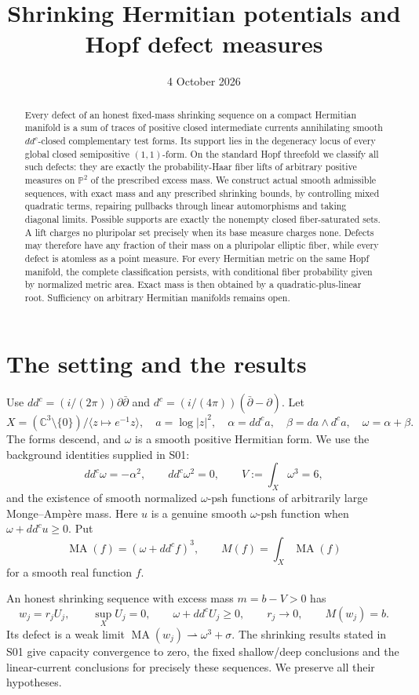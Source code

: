 \documentclass[11pt]{article}
\title{Shrinking Hermitian potentials and Hopf defect measures}
\author{}
\date{4 October 2026}
\newcommand{\ddc}{dd^c}
\newcommand{\MA}{\operatorname{MA}}
\begin{document}
\maketitle
\begin{abstract}
Every defect of an honest fixed-mass shrinking sequence on a compact
Hermitian manifold is a sum of traces of positive closed intermediate
currents annihilating smooth $dd^c$-closed complementary test forms.
Its support lies in the
degeneracy locus of every global closed semipositive $(1,1)$-form.
On the standard Hopf threefold we classify all such defects: they are
exactly the probability-Haar fiber lifts of arbitrary positive measures
on $\mathbb P^2$ of the prescribed excess mass. We construct actual
smooth admissible sequences, with exact mass and any prescribed
shrinking bounds, by controlling mixed quadratic terms, repairing
pullbacks through linear automorphisms and taking diagonal limits.
Possible supports are exactly the nonempty closed fiber-saturated sets.
A lift charges no pluripolar set precisely when its base measure
charges none. Defects may therefore have any fraction of their mass
on a pluripolar elliptic fiber, while every defect is atomless as a
point measure. For every Hermitian metric on the same Hopf manifold,
the complete classification persists, with conditional fiber probability given
by normalized metric area. Exact mass is then obtained by a
quadratic-plus-linear root. Sufficiency on arbitrary Hermitian
manifolds remains open.
\end{abstract}

\section{The setting and the results}
Use $\ddc=(i/(2\pi))\partial\bar\partial$ and
$d^c=(i/(4\pi))(\bar\partial-\partial)$. Let
\[
 X=(\mathbb C^3\setminus\{0\})/\langle z\mapsto e^{-1}z\rangle,
 \quad a=\log|z|^2,
 \quad \alpha=\ddc a,\quad \beta=da\wedge d^c a,
 \quad \omega=\alpha+\beta.
\]
The forms descend, and $\omega$ is a smooth positive Hermitian form.
We use the background identities supplied in S01:
\[
 \ddc\omega=-\alpha^2,\qquad
 \ddc\omega^2=0,\qquad V:=\int_X\omega^3=6,
\]
and the existence of smooth normalized $\omega$-psh functions of
arbitrarily large Monge--Amp\`ere mass. Here $u$ is a genuine smooth
$\omega$-psh function when $\omega+\ddc u\geq0$. Put
\[
 \MA(f)=(\omega+\ddc f)^3,\qquad M(f)=\int_X\MA(f)
\]
for a smooth real function $f$.

An honest shrinking sequence with excess mass $m=b-V>0$ has
\[
 w_j=r_jU_j,\qquad \sup_X U_j=0,\qquad
 \omega+\ddc U_j\geq0,\qquad r_j\longrightarrow0,
 \qquad M(w_j)=b.
\]
Its defect is a weak limit $\MA(w_j)\rightharpoonup\omega^3+\sigma$.
The shrinking results stated in S01 give capacity convergence to zero,
the fixed shallow/deep conclusions and the linear-current conclusions
for precisely these sequences. We preserve all their hypotheses.
\end{document}
